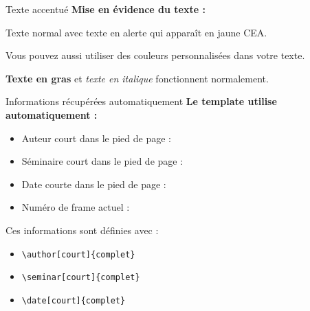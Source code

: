 \documentclass[10pt,aspectratio=169]{beamer}
\begin{document}
\begin{frame}{Texte accentué}
\textbf{Mise en évidence du texte :}

Texte normal avec \alert{texte en alerte} qui apparaît en jaune CEA.

\vspace{1em}

Vous pouvez aussi utiliser \textcolor{CEAyellow}{des couleurs personnalisées} dans votre texte.

\vspace{1em}

\textbf{Texte en gras} et \textit{texte en italique} fonctionnent normalement.
\end{frame}

\begin{frame}{Informations récupérées automatiquement}
\textbf{Le template utilise automatiquement :}
\begin{itemize}
    \item Auteur court dans le pied de page : \insertshortauthor
    \item Séminaire court dans le pied de page : \insertshortseminar
    \item Date courte dans le pied de page : \insertshortdate
    \item Numéro de frame actuel : \insertframenumber
\end{itemize}

\vspace{1em}
Ces informations sont définies avec :
\begin{itemize}
    \item \texttt{\textbackslash author[court]\{complet\}}
    \item \texttt{\textbackslash seminar[court]\{complet\}}
    \item \texttt{\textbackslash date[court]\{complet\}}
\end{itemize}
\end{frame}
\end{document}
